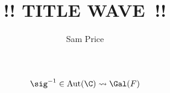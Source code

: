 \documentclass{article}
\author{Sam Price}
\date{}
\title{!! TITLE WAVE~!!}
\begin{document}
\maketitle

\[ \sig\inv \in \Aut(\C) \leadsto \Gal(F) \]
\end{document}
